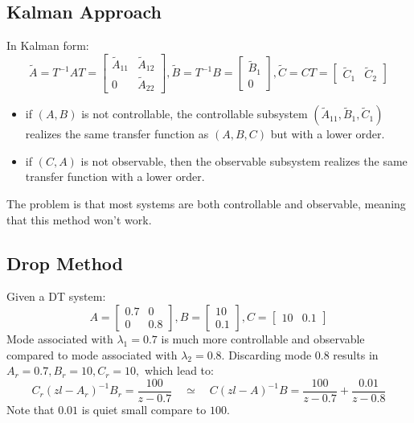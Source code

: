 \documentclass[10pt,a4paper,oneside]{article}
\begin{document}
\subsection{Kalman Approach}
In Kalman form:
\[
\tilde{A}=T^{-1} A T=\left[\begin{array}{cc}{\tilde{A}_{11}} & {\tilde{A}_{12}} \\ {0} & {\tilde{A}_{22}}\end{array}\right], \tilde{B}=T^{-1} B=\left[\begin{array}{c}{\tilde{B}_{1}} \\ {0}\end{array}\right], \tilde{C}=C T=\left[\begin{array}{cc}{\tilde{C}_{1}} & {\tilde{C}_{2}}\end{array}\right]
\]
\begin{itemize}
	\item if $(A,B)$ is not controllable, the controllable subsystem $
	\left(\tilde{A}_{11}, \tilde{B}_{1}, \tilde{C}_{1}\right)
	$ realizes the same transfer function as $(A,B,C)$ but with a lower order.
	\item if $(C, A)$ is not observable, then the observable subsystem realizes the same transfer function with a lower order.
\end{itemize}
The problem is that most systems are both controllable and observable, meaning that this method won't work.

\subsection{Drop Method}
Given a DT system:
\[
A=\left[\begin{array}{cc}{0.7} & {0} \\ {0} & {0.8}\end{array}\right]
,
B=\left[\begin{array}{l}{10} \\ {0.1}\end{array}\right]
,
C=\left[\begin{array}{ll}{10} & {0.1}\end{array}\right]
\]
Mode associated with $\lambda_1=0.7$ is much more controllable and observable compared to mode associated with $\lambda_2=0.8$. Discarding mode $0.8$ results in $A_r=0.7, B_r=10, C_r=10,$ which lead to:
\[
C_{r}\left(z l-A_{r}\right)^{-1} B_{r}=\frac{100}{z-0.7} \quad \simeq \quad C(z l-A)^{-1} B=\frac{100}{z-0.7}+\frac{0.01}{z-0.8}
\]
Note that $0.01$ is quiet small compare to $100$.
\end{document}
